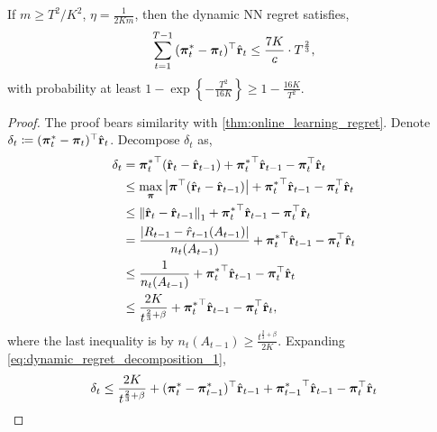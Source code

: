 \begin{thm}
\label{thm:dynamic_regret_sublinear}
    If $m \ge T^2/K^2$, $\eta = \frac{1}{2 K m}$, then the dynamic NN regret satisfies,
\begin{equation*}
\begin{split}
    \sum\limits_{t=1}^{T-1}{ (  {{\boldsymbol{\pi}}_t^*} - {\boldsymbol{\pi}}_t )^\top \hat{{\mathbf{r}}}_t } \le \frac{7 K}{c} \cdot  T^{\frac{2}{3}},
\end{split}
\end{equation*}
with probability at least $1 - \exp\left\{ - \frac{T^2}{16 K} \right\} \ge 1 - \frac{16 K}{T^2}$.
\end{thm}
\begin{proof}
The proof bears similarity with \cref{thm:online_learning_regret}.
    Denote $\delta_t \coloneqq ( {{\boldsymbol{\pi}}_t^*} - {\boldsymbol{\pi}}_t )^\top \hat{{\mathbf{r}}}_t$. Decompose $\delta_t$ as,
\begin{equation}
\label{eq:dynamic_regret_decomposition_1}
\begin{split}
    \delta_t &= {{\boldsymbol{\pi}}_t^*}^\top ( \hat{{\mathbf{r}}}_t - \hat{{\mathbf{r}}}_{t-1}) + {{\boldsymbol{\pi}}_t^*}^\top \hat{{\mathbf{r}}}_{t-1} - {\boldsymbol{\pi}}_t^\top \hat{{\mathbf{r}}}_t \\
    &\le \max\limits_{{\boldsymbol{\pi}}}{ \left| {\boldsymbol{\pi}}^\top ( \hat{{\mathbf{r}}}_t - \hat{{\mathbf{r}}}_{t-1}) \right| } + {{\boldsymbol{\pi}}_t^*}^\top \hat{{\mathbf{r}}}_{t-1} - {\boldsymbol{\pi}}_t^\top \hat{{\mathbf{r}}}_t \\
    &\le \left\| \hat{{\mathbf{r}}}_t - \hat{{\mathbf{r}}}_{t-1} \right\|_1 + {{\boldsymbol{\pi}}_t^*}^\top \hat{{\mathbf{r}}}_{t-1} - {\boldsymbol{\pi}}_t^\top \hat{{\mathbf{r}}}_t \\
    &= \frac{ \left| R_{t-1} - \hat{r}_{t-1}(A_{t-1}) \right| }{n_t(A_{t-1})} + {{\boldsymbol{\pi}}_t^*}^\top \hat{{\mathbf{r}}}_{t-1} - {\boldsymbol{\pi}}_t^\top \hat{{\mathbf{r}}}_t \\
    &\le \frac{ 1 }{n_t(A_{t-1})} + {{\boldsymbol{\pi}}_t^*}^\top \hat{{\mathbf{r}}}_{t-1} - {\boldsymbol{\pi}}_t^\top \hat{{\mathbf{r}}}_t \\
    &\le \frac{ 2 K }{t^{\frac{2}{3} + \beta}} + {{\boldsymbol{\pi}}_t^*}^\top \hat{{\mathbf{r}}}_{t-1} - {\boldsymbol{\pi}}_t^\top \hat{{\mathbf{r}}}_t,
\end{split}
\end{equation}
where the last inequality is by $n_{t}(A_{t-1}) \ge \frac{t^{\frac{2}{3} + \beta}}{ 2 K }$. Expanding \cref{eq:dynamic_regret_decomposition_1}, 
\begin{equation}
\label{eq:dynamic_regret_decomposition_2}
\begin{split}
    \delta_t &\le \frac{ 2 K }{t^{\frac{2}{3} + \beta}} + ( {\rvpi_t^*} - {\rvpi_{t-1}^*} )^\top \hat{\rvr}_{t-1} + {\rvpi_{t-1}^*}^\top \hat{\rvr}_{t-1} - \rvpi_t^\top \hat{\rvr}_t \\

\end{split}
\end{equation}
\end{proof}
